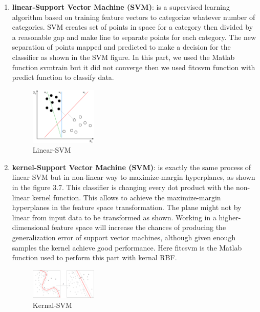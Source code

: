 \begin{enumerate}
\item \textbf{linear-Support Vector Machine (SVM)}: is a supervised learning algorithm based on training feature vectors to categorize whatever number of categories.
SVM creates set of points in space for a category then divided by a reasonable gap and make line to separate points for each category\cite{vermeer2011automated}.
The new separation of points mapped and predicted to make a decision for the classifier as shown in the SVM figure.
In this part, we used the Matlab function svmtrain but it did not converge then we used fitcsvm function with predict function to classify data.

\begin{figure}[htb]
        \centering
        \includegraphics[width = 0.3\textwidth, height = 0.3\textheight]{figures/SVM.png} %
  \caption{Linear-SVM \cite{SVMmethod}}
  \label{fig:SVM}
\end{figure}

\item \textbf{kernel-Support Vector Machine (SVM)}: is exactly the same process of linear SVM but in non-linear way to maximize-margin hyperplanes, as shown in the figure 3.7.
This classifier is changing every dot product with the non-linear kernel function.
This allows to achieve the maximize-margin hyperplanes in the feature space transformation.
The plane might not by linear from input data to be transformed as shown.
Working in a higher-dimensional feature space will increase the chances of producing the generalization error of support vector machines, although given enough samples the kernel achieve good performance.
Here fitcsvm is the Matlab function used to perform this part with kernal RBF.
\begin{figure}[htb]
        \centering
        \includegraphics[width = 0.3\textwidth, height = 0.3\textheight]{figures/Kernel_Machine.png} %
  \caption{Kernal-SVM \cite{SVMmethodkernal}}
  \label{fig:SVM}
\end{figure}


\end{enumerate}
